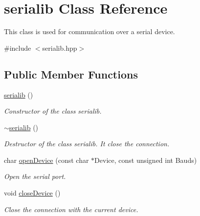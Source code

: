 \hypertarget{classserialib}{}\section{serialib Class Reference}
\label{classserialib}


This class is used for communication over a serial device.  




{\ttfamily \#include $<$serialib.\+hpp$>$}

\subsection*{Public Member Functions}
\begin{DoxyCompactItemize}
\item 
\mbox{\label{classserialib_a26166f63ad73013ca7cbcd2ae59edc91}} 
\hyperlink{classserialib_a26166f63ad73013ca7cbcd2ae59edc91}{serialib} ()
\begin{DoxyCompactList}\small\item\em Constructor of the class serialib. \end{DoxyCompactList}\item 
\mbox{\label{classserialib_ac44215001ae198f2c196bb7993327a4b}} 
\hyperlink{classserialib_ac44215001ae198f2c196bb7993327a4b}{$\sim$serialib} ()
\begin{DoxyCompactList}\small\item\em Destructor of the class serialib. It close the connection. \end{DoxyCompactList}\item 
char \hyperlink{classserialib_a5c2f95793e0fcd7fa6615682e8f58f16}{open\+Device} (const char $\ast$Device, const unsigned int Bauds)
\begin{DoxyCompactList}\small\item\em Open the serial port. \end{DoxyCompactList}\item 
\mbox{\label{classserialib_a8a1c8803c8df1a19222d6006328534b8}} 
void \hyperlink{classserialib_a8a1c8803c8df1a19222d6006328534b8}{close\+Device} ()
\begin{DoxyCompactList}\small\item\em Close the connection with the current device. \end{DoxyCompactList}\item 

\end{DoxyCompactItemize}
